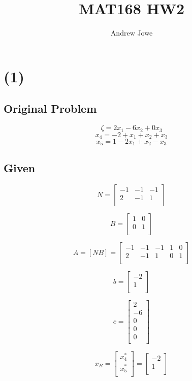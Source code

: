 \documentclass[14pt]{extarticle}
\title{MAT168 HW2}
\author{Andrew Jowe}
\begin{document}
\maketitle

\section*{(1)}
\subsection*{Original Problem}
\[
    \zeta = 2x_1 - 6x_2 + 0x_3
\]
\[
    x_4 = -2 + x_1 + x_2 + x_3
\]
\[
    x_5 = 1 - 2x_1 + x_2 - x_3
\]

\subsection*{Given}
\[
    N=\begin{bmatrix}
        -1 & -1 & -1 \\
        2 & -1 & 1 \\
    \end{bmatrix}
\]

\[
    B=\begin{bmatrix}
        1 & 0 \\
        0 & 1 \\
    \end{bmatrix}
\]

\[
    A
    =\left[NB\right]
    =\begin{bmatrix}
        -1 & -1 & -1 & 1 & 0 \\
        2 & -1 & 1 & 0 & 1 \\
    \end{bmatrix}
\]

\[
    b=\begin{bmatrix}
        -2 \\
        1 \\
    \end{bmatrix}
\]

\[
    c=\begin{bmatrix}
        2 \\
        -6 \\
        0 \\
        0 \\
        0 \\
    \end{bmatrix}
\]

\[
    x_B = \begin{bmatrix}
        x^*_4 \\
        x^*_5 \\
    \end{bmatrix}
    = \begin{bmatrix}
        -2 \\
        1 \\
    \end{bmatrix}
\]
\end{document}
